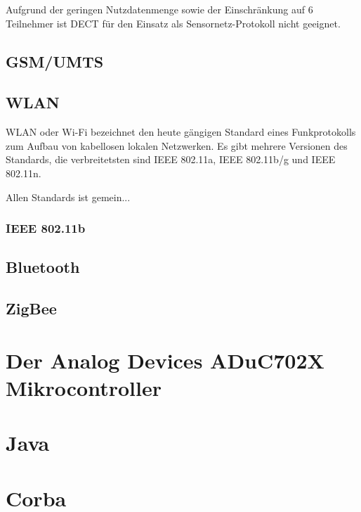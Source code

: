 Aufgrund der geringen Nutzdatenmenge sowie der Einschränkung auf 6 Teilnehmer ist
DECT für den Einsatz als Sensornetz-Protokoll nicht geeignet.

\subsection{GSM/UMTS}
\subsection{WLAN}

WLAN oder Wi-Fi bezeichnet den heute gängigen Standard eines Funkprotokolls zum Aufbau
von kabellosen lokalen Netzwerken. Es gibt mehrere Versionen des Standards, die verbreitetsten
sind IEEE 802.11a, IEEE 802.11b/g und IEEE 802.11n. 

Allen Standards ist gemein...

\subsubsection{IEEE 802.11b}
\subsection{Bluetooth}
\subsection{ZigBee}

\section{Der Analog Devices ADuC702X Mikrocontroller}

\section{Java}

\section{Corba}
